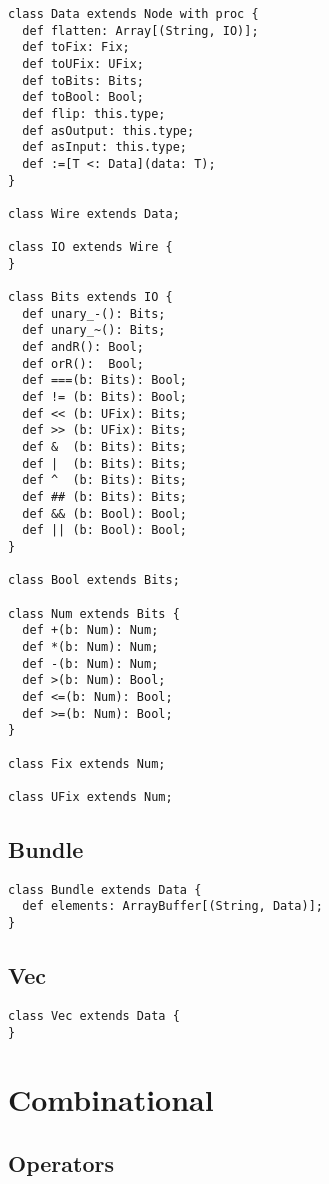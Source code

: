 \documentclass[10pt,twocolumn]{article}
\begin{document}
\begin{verbatim}
class Data extends Node with proc {
  def flatten: Array[(String, IO)];
  def toFix: Fix;
  def toUFix: UFix;
  def toBits: Bits;
  def toBool: Bool;
  def flip: this.type;
  def asOutput: this.type;
  def asInput: this.type;
  def :=[T <: Data](data: T);
}

class Wire extends Data;

class IO extends Wire {
}

class Bits extends IO {
  def unary_-(): Bits;
  def unary_~(): Bits;
  def andR(): Bool;
  def orR():  Bool;
  def ===(b: Bits): Bool;
  def != (b: Bits): Bool;
  def << (b: UFix): Bits;
  def >> (b: UFix): Bits;
  def &  (b: Bits): Bits;
  def |  (b: Bits): Bits;
  def ^  (b: Bits): Bits;
  def ## (b: Bits): Bits;
  def && (b: Bool): Bool;
  def || (b: Bool): Bool;
}

class Bool extends Bits;

class Num extends Bits {
  def +(b: Num): Num;
  def *(b: Num): Num;
  def -(b: Num): Num;
  def >(b: Num): Bool;
  def <=(b: Num): Bool;
  def >=(b: Num): Bool;
}

class Fix extends Num; 

class UFix extends Num; 
\end{verbatim}

\subsection{Bundle}

\begin{verbatim}
class Bundle extends Data {
  def elements: ArrayBuffer[(String, Data)];
}
\end{verbatim}

\subsection{Vec}

\begin{verbatim}
class Vec extends Data {
}
\end{verbatim}

\section{Combinational}

\subsection{Operators}
\end{document}
